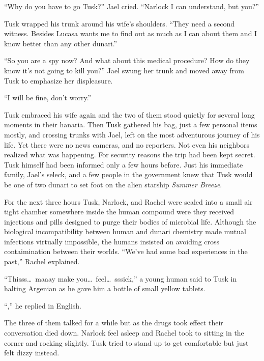 
``Why do you have to go Tusk?'' Jael cried. ``Narlock I can understand, but you?''

Tusk wrapped his trunk around his wife's shoulders. ``They need a second witness. Besides Lucasa
wants me to find out as much as I can about them and I know  better than any
other dunari.''

``So you are a spy now? And what about this medical procedure? How do they know it's not going
to kill you?'' Jael swung her trunk and moved away from Tusk to emphasize her displeasure.

``I will be fine, don't worry.''

Tusk embraced his wife again and the two of them stood quietly for several long moments in their
hanaria. Then Tusk gathered his bag, just a few personal items mostly, and crossing trunks with
Jael, left on the most adventurous journey of his life. Yet there were no news cameras, and no
reporters. Not even his neighbors realized what was happening. For security reasons the trip had
been kept secret. Tusk himself had been informed only a few hours before. Just his immediate
family, Jael's seleck, and a few people in the government knew that Tusk would be one of two
dunari to set foot on the alien starship \textit{Summer Breeze}.

For the next three hours Tusk, Narlock, and Rachel were sealed into a small air tight chamber
somewhere inside the human compound were they received injections and pills designed to purge
their bodies of microbial life. Although the biological incompatibility between human and dunari
chemistry made mutual infections virtually impossible, the humans insisted on avoiding cross
contaimination between their worlds. ``We've had some bad experiences in the past,'' Rachel
explained.


``Thisss\ldots\ maaay make you\ldots\ feel\ldots\ sssick,'' a young human said to Tusk in
halting Argenian as he gave him a bottle of small yellow tablets.

``,'' he replied in English.

The three of them talked for a while but as the drugs took effect their conversation died down.
Narlock feel asleep and Rachel took to sitting in the corner and rocking slightly. Tusk tried to
stand up to get comfortable but just felt dizzy instead.

